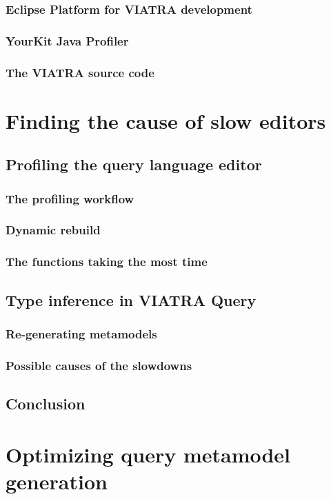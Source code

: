 \documentclass[11pt,a4paper,oneside]{report}
\begin{document}
\subsection{Eclipse Platform for VIATRA development}
\subsection{YourKit Java Profiler}
\subsection{The VIATRA source code}

\chapter{Finding the cause of slow editors}
\section{Profiling the query language editor}
\subsection{The profiling workflow}
\subsection{Dynamic rebuild}
\subsection{The functions taking the most time}
\section{Type inference in VIATRA Query}
\subsection{Re-generating metamodels}
\subsection{Possible causes of the slowdowns}
\section{Conclusion}

\chapter{Optimizing query metamodel generation}
\end{document}
